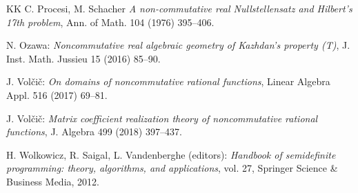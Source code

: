 \documentclass[12pt,a4paper]{amsart}
\theoremstyle{definition}
\theoremstyle{remark}
\numberwithin{equation}{section}
\begin{document}
\begin{thebibliography}{KK}
C. Procesi, M. Schacher
{\it A non-commutative real Nullstellensatz and Hilbert's 17th problem},
Ann. of Math. 104 (1976) 395--406.

N. Ozawa:
{\it Noncommutative real algebraic geometry of Kazhdan’s property (T)},
J. Inst. Math. Jussieu 15 (2016) 85--90.

J. Vol\v{c}i\v{c}:
{\it On domains of noncommutative rational functions}, 
Linear Algebra Appl. 516 (2017) 69--81.

J. Vol\v{c}i\v{c}:
{\it Matrix coefficient realization theory of noncommutative rational functions},
J. Algebra 499 (2018) 397--437.

H. Wolkowicz, R. Saigal, L. Vandenberghe (editors):
{\it Handbook  of  semidefinite  programming: theory, algorithms, and applications},
vol. 27, Springer Science \& Business Media, 2012.

\end{thebibliography}
\end{document}
